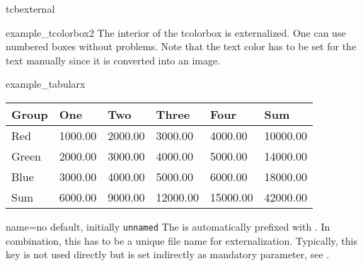 \begin{docEnvironment}[doc new=2015-03-11]{tcbexternal}{}
\begin{dispExample}
\begin{tcolorbox}[nobeforeafter,enhanced,
      fonttitle=\bfseries,title=Externalized Box,
      colframe=blue!50!black,
      interior style={fill overzoom image=blueshade.png}]
  \begin{tcbexternal}[minipage]{example_tcolorbox2}
    \color{white}%
    The interior of the tcolorbox is externalized.
    One can use numbered boxes without problems.
    Note that the text color has to be set for the text manually
    since it is converted into an image.
  \end{tcbexternal}
\end{tcolorbox}
\end{dispExample}

\begin{dispExample}
\begin{tcbexternal}[minipage]{example_tabularx}
  \begin{tabularx}{\linewidth}{|l||Y|Y|Y|Y||Y|}\hline
    Group & One & Two & Three & Four & Sum\\\hline\hline
    Red & 1000.00 & 2000.00 & 3000.00 & 4000.00 & 10000.00\\\hline
    Green & 2000.00 & 3000.00 & 4000.00 & 5000.00 & 14000.00\\\hline
    Blue & 3000.00 & 4000.00 & 5000.00 & 6000.00 & 18000.00\\\hline\hline
    Sum & 6000.00 & 9000.00 & 12000.00 & 15000.00 & 42000.00\\\hline
  \end{tabularx}
\end{tcbexternal}
\end{dispExample}


\end{docEnvironment}

\begin{extTcbKey}[][doc new=2015-03-11]{name}{=}{no default,
  initially \texttt{unnamed}}
The  is automatically prefixed with .
In combination, this has to be a unique file name for externalization.
Typically, this key is not used directly but is set indirectly as
mandatory parameter, see .
\end{extTcbKey}


